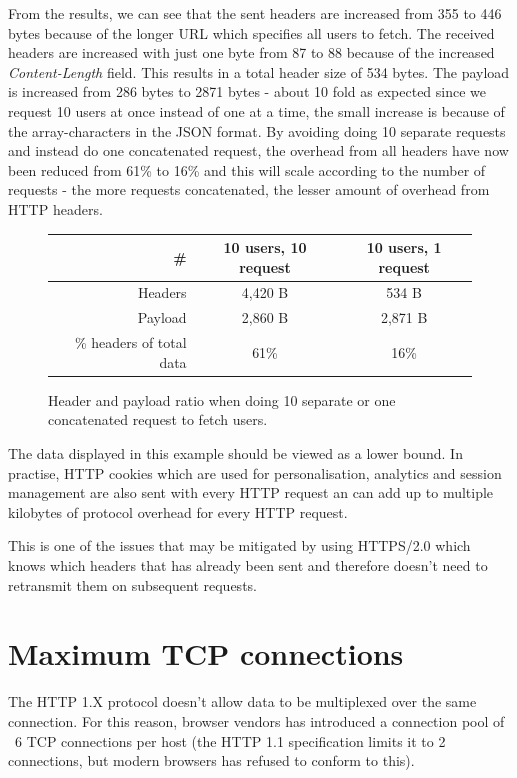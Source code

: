 \documentclass{cslthse-msc}
\begin{document}
From the results, we can see that the sent headers are increased from 355 to 446 bytes because of the longer URL which specifies all users to fetch. The received headers are increased with just one byte from 87 to 88 because of the increased \emph{Content-Length} field. This results in a total header size of 534 bytes. The payload is increased from 286 bytes to 2871 bytes - about 10 fold as expected since we request 10 users at once instead of one at a time, the small increase is because of the array-characters in the JSON format. By avoiding doing 10 separate requests and instead do one concatenated request, the overhead from all headers have now been reduced from 61\% to 16\% and this will scale according to the number of requests - the more requests concatenated, the lesser amount of overhead from HTTP headers.

\begin{figure}[H]
  \centering
    \begin{center}
      \begin{tabular}{ r | c | c }
        \textbf{\#} & \textbf{10 users, 10 request} & \textbf{10 users, 1 request} \\ \hline
        Headers & 4,420 B & 534 B \\ \hline
        Payload & 2,860 B & 2,871 B \\ \hline
        \% headers of total data & 61\% & 16\% \\ \hline
      \end{tabular}
    \end{center}
  \caption{Header and payload ratio when doing 10 separate or one concatenated request to fetch users.}
\end{figure}

The data displayed in this example should be viewed as a lower bound. In practise, HTTP cookies which are used for personalisation, analytics and session management are also sent with every HTTP request an can add up to multiple kilobytes of protocol overhead for every HTTP request\cite[p. 200]{HPBN}.

This is one of the issues that may be mitigated by using HTTPS/2.0 which knows which headers that has already been sent and therefore doesn't need to retransmit them on subsequent requests\cite[p. 222]{HPBN}.

\section{Maximum TCP connections}
The HTTP 1.X protocol doesn't allow data to be multiplexed over the same connection\cite[p.194]{HPBN}. For this reason, browser vendors has introduced a connection pool of ~6 TCP connections per host (the HTTP 1.1 specification limits it to 2 connections\cite{rfc2616}, but modern browsers has refused to conform to this).
\end{document}
